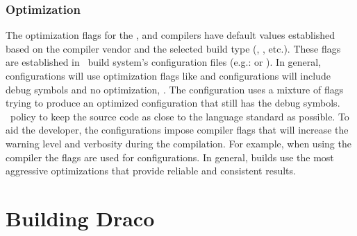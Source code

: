 \subsubsection{Optimization}
\label{sec:optimization}

The optimization flags for the ,  and  compilers have default values established 
based on the compiler vendor and the selected build type (, , etc.).  These flags
are established in \draco\ build system's configuration files  
(e.g.:  or ).  In general,  configurations will use optimization flags like  and  configurations will include debug symbols and no optimization, .  The  configuration uses a mixture of flags trying to produce an optimized configuration that still has the debug symbols.  \draco\ policy to keep the source code as close to the language standard as possible.   To aid the developer, the  configurations impose compiler flags that will increase the warning level and verbosity during the compilation.  For example, when using the  compiler the flags  are used for  configurations. In general,  builds use the most aggressive optimizations that provide reliable and consistent results.



\section{Building Draco}
\label{sec:building_draco}

